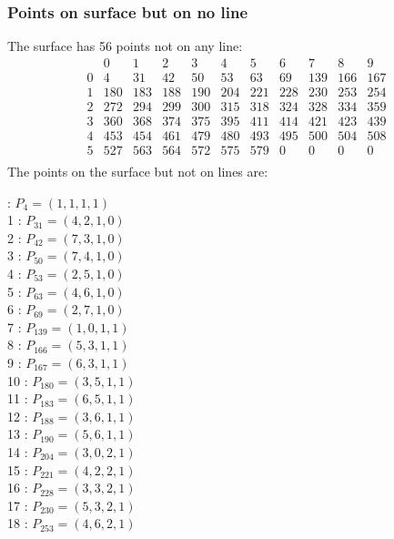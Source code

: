 \documentclass{article}
\begin{document}
{\subsubsection*{Points on surface but on no line}
The surface has 56 points not on any line:\\
$$
\begin{array}{r|*{10}{r}}
 & 0 & 1 & 2 & 3 & 4 & 5 & 6 & 7 & 8 & 9\\
\hline
0 & 4 & 31 & 42 & 50 & 53 & 63 & 69 & 139 & 166 & 167\\
1 & 180 & 183 & 188 & 190 & 204 & 221 & 228 & 230 & 253 & 254\\
2 & 272 & 294 & 299 & 300 & 315 & 318 & 324 & 328 & 334 & 359\\
3 & 360 & 368 & 374 & 375 & 395 & 411 & 414 & 421 & 423 & 439\\
4 & 453 & 454 & 461 & 479 & 480 & 493 & 495 & 500 & 504 & 508\\
5 & 527 & 563 & 564 & 572 & 575 & 579 & 0 & 0 & 0 & 0\\
\end{array}
$$
The points on the surface but not on lines are:\\
\begin{multicols}{2}
 : $P_{4}=( 1, 1, 1, 1 )$\\
1 : $P_{31}=( 4, 2, 1, 0 )$\\
2 : $P_{42}=( 7, 3, 1, 0 )$\\
3 : $P_{50}=( 7, 4, 1, 0 )$\\
4 : $P_{53}=( 2, 5, 1, 0 )$\\
5 : $P_{63}=( 4, 6, 1, 0 )$\\
6 : $P_{69}=( 2, 7, 1, 0 )$\\
7 : $P_{139}=( 1, 0, 1, 1 )$\\
8 : $P_{166}=( 5, 3, 1, 1 )$\\
9 : $P_{167}=( 6, 3, 1, 1 )$\\
10 : $P_{180}=( 3, 5, 1, 1 )$\\
11 : $P_{183}=( 6, 5, 1, 1 )$\\
12 : $P_{188}=( 3, 6, 1, 1 )$\\
13 : $P_{190}=( 5, 6, 1, 1 )$\\
14 : $P_{204}=( 3, 0, 2, 1 )$\\
15 : $P_{221}=( 4, 2, 2, 1 )$\\
16 : $P_{228}=( 3, 3, 2, 1 )$\\
17 : $P_{230}=( 5, 3, 2, 1 )$\\
18 : $P_{253}=( 4, 6, 2, 1 )$\\

\end{multicols}}
\end{document}
